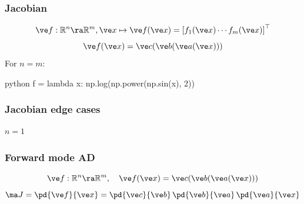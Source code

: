 \documentclass[fleqn,10pt]{beamer}
\begin{document}
\begin{frame}[fragile]
    \frametitle{Jacobian}
    \begin{equation*}
        \ve f: \mathbb R^n \ra \mathbb R^m, \ve x\mapsto \ve f(\ve x) = \left[f_1(\ve x) \cdots f_m(\ve x)\right]^\top
    \end{equation*}
    \begin{equation*}
        \ve f(\ve x) = \ve c(\ve b(\ve a(\ve x)))
    \end{equation*}
    For $n=m$:
    \begin{mintedcode}{python}
    f = lambda x: np.log(np.power(np.sin(x), 2))
    \end{mintedcode}
    \vfill
\end{frame}

\begin{frame}
    \frametitle{Jacobian edge cases}
    $n=1$
    \edgecol
\end{frame}


\begin{frame}
    \frametitle{Forward mode AD}
    \begin{equation*}
        \ve f: \mathbb R^n \ra \mathbb R^m,\quad\ve f(\ve x) = \ve c(\ve b(\ve a(\ve x)))
    \end{equation*}
    \begin{equation*}
        \ma J=\pd{\ve f}{\ve x} = \pd{\ve c}{\ve b}\,\pd{\ve b}{\ve a}\,\pd{\ve a}{\ve x}
    \end{equation*}
    \vfill
    \vfill
\end{frame}
\end{document}
